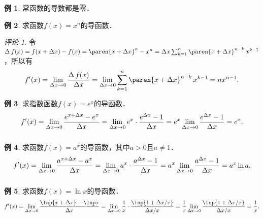\documentclass[a4paper,punct=CCT]{ctexbook}
\theoremstyle{definition}
\newtheorem*{example*}{例}
\theoremstyle{remark}
\newtheorem*{remark}{评论}
\begin{document}
\begin{example*}
  常函数的导数都是零．
\end{example*}

\begin{example*}
  求函数\(f(x) = x^n\)的导函数．

  \begin{remark}
    令\(\fwdf\,f(x) = f(x+\fwdf x) - f(x) = \paren{x+\fwdf x}^n - x^n = \fwdf x \sum_{k=1}^n \paren{x+\fwdf x}^{n-k}\,x^{k-1}\)，所以有
    \begin{equation*}
      f'(x)
      = \lim_{\fwdf x \to 0} \frac{\fwdf\,f(x)}{\fwdf x}
      = \lim_{\fwdf x \to 0} \sum_{k=1}^n \paren{x+\fwdf x}^{n-k}\,x^{k-1}
      = nx^{n-1}.
    \end{equation*}
  \end{remark}
\end{example*}

\begin{example*}
  求指数函数\(f(x) = e^x\)的导函数．
  \begin{equation*}
    f'(x)
    = \lim_{\fwdf x \to 0} \frac{e^{x+\fwdf x} - e^x}{\fwdf x}
    = \lim_{\fwdf x \to 0} e^x \cdot \frac{e^{\fwdf x} - 1}{\fwdf x}
    = e^x \lim_{\fwdf x \to 0} \frac{e^{\fwdf x} - 1}{\fwdf x}
    = e^x.
    \rule[-3.5ex]{0ex}{0ex}
  \end{equation*}
\end{example*}

\begin{example*}
  求函数\(f(x) = a^x\)的导函数，其中\(a > 0\)且\(a \ne 1\)．
  \begin{equation*}
    f'(x)
    = \lim_{\fwdf x \to 0} \frac{a^{x+\fwdf x} - a^x}{\fwdf x}
    = \lim_{\fwdf x \to 0} a^x \cdot \frac{a^{\fwdf x} - 1}{\fwdf x}
    = a^x \lim_{\fwdf x \to 0} \frac{a^{\fwdf x} - 1}{\fwdf x}
    = a^x \ln a.
    \rule[-3.5ex]{0ex}{0ex}
  \end{equation*}
\end{example*}

\begin{example*}
  求函数\(f(x) = \ln x\)的导函数．
  \begin{equation*}
    f'(x)
    = \lim_{\fwdf x \to 0} \frac{\lnp{x+\fwdf x}- \lnp x}{\fwdf x}
    = \lim_{\fwdf x \to 0} \frac1x \cdot \frac{\lnp{1+\fwdf x/x}}{\fwdf x/x}
    = \frac1x \lim_{\fwdf x \to 0} \frac{\lnp{1+\fwdf x/x}}{\fwdf x/x}
    = \frac1x.
  \end{equation*}
\end{example*}
\end{document}
